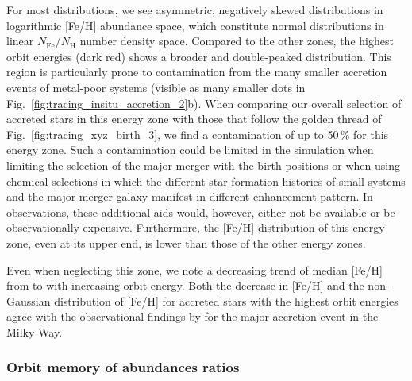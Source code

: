 \documentclass[fleqn,usenatbib]{mnras}
\begin{document}
For most distributions, we see asymmetric, negatively skewed distributions in logarithmic [Fe/H] abundance space, which constitute normal distributions in linear $N_\mathrm{Fe}/N_\mathrm{H}$ number density space. Compared to the other zones, the highest orbit energies (dark red) shows a broader and double-peaked distribution. This region is particularly prone to contamination from the many smaller accretion events of metal-poor systems (visible as many smaller dots in Fig.~\ref{fig:tracing_insitu_accretion_2}b). When comparing our overall selection of accreted stars in this energy zone with those that follow the golden thread of Fig.~\ref{fig:tracing_xyz_birth_3}, we find a contamination of up to 50\,\% for this energy zone. Such a contamination could be limited in the simulation when limiting the selection of the major merger with the birth positions or when using chemical selections in which the different star formation histories of small systems and the major merger galaxy manifest in different enhancement pattern. In observations, these additional aids would, however, either not be available or be observationally expensive. Furthermore, the [Fe/H] distribution of this energy zone, even at its upper end, is lower than those of the other energy zones.

Even when neglecting this zone, we note a decreasing trend of median [Fe/H] from  to  with increasing orbit energy. Both the decrease in [Fe/H] and the non-Gaussian distribution of [Fe/H] for accreted stars with the highest orbit energies agree with the observational findings by \citet[][see their Fig.~3]{Skuladottir2025} for the major accretion event in the Milky Way.

\subsubsection{Orbit memory of abundances ratios}
\end{document}
